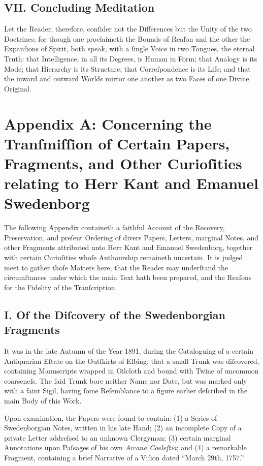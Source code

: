 \documentclass[12pt]{article}
\begin{document}
\subsection*{VII. Concluding Meditation}

Let the Reader, therefore, conſider not the Differences but the Unity of the 
two Doctrines; for though one proclaimeth the Bounds of Reaſon and the other 
the Expanſions of Spirit, both speak, with a ſingle Voice in two Tongues, the 
eternal Truth: that Intelligence, in all its Degrees, is Human in Form; that 
Analogy is its Mode; that Hierarchy is its Structure; that Correſpondence is 
its Life; and that the inward and outward Worlds mirror one another as two 
Faces of one Divine Original.

\newpage

\appendix
\section*{Appendix A: Concerning the Tranſmiſſion of Certain Papers, Fragments, and Other Curioſities relating to Herr Kant and Emanuel Swedenborg}

The following Appendix containeth a faithful Account of the Recovery, 
Preservation, and preſent Ordering of divers Papers, Letters, marginal Notes, 
and other Fragments attributed unto Herr Kant and Emanuel Swedenborg, together 
with certain Curioſities whoſe Authourship remaineth uncertain. It is judged 
meet to gather thoſe Matters here, that the Reader may underſtand the 
circumſtances under which the main Text hath been prepared, and the Reaſons 
for the Fidelity of the Tranſcription.

\subsection*{I. Of the Diſcovery of the Swedenborgian Fragments}
It was in the late Autumn of the Year 1891, during the Cataloguing of a 
certain Antiquarian Eſtate on the Outſkirts of Elbing, that a small Trunk was 
diſcovered, containing Manuscripts wrapped in Oilcloth and bound with Twine of 
uncommon coarseneſs. The ſaid Trunk bore neither Name nor Date, but was 
marked only with a faint Sigil, having ſome Reſemblance to a figure earlier 
deſcribed in the main Body of this Work.

Upon examination, the Papers were found to contain: (1) a Series of 
Swedenborgian Notes, written in his late Hand; (2) an incomplete Copy of a 
private Letter addreſsed to an unknown Clergyman; (3) certain marginal 
Annotations upon Paſsages of his own \textit{Arcana Coeleſtia}; and (4) a 
remarkable Fragment, containing a brief Narrative of a Viſion dated “March 
29th, 1757.”
\end{document}

